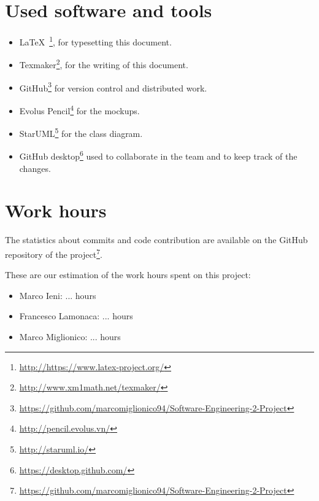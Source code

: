 \section{Used software and tools}
\begin{itemize}
    \item \LaTeX\ \footnote{\url{http://https://www.latex-project.org/}}, for typesetting this document.
    \item Texmaker\footnote{\url{http://www.xm1math.net/texmaker/}}, for the writing of this document.
    \item GitHub\footnote{\url{https://github.com/marcomiglionico94/Software-Engineering-2-Project}} for version control and distributed work.
    \item Evolus Pencil\footnote{\url{http://pencil.evolus.vn/}} for the mockups.
    \item StarUML\footnote{\url{http://staruml.io/}} for the class diagram.
    \item GitHub desktop\footnote{\url{https://desktop.github.com/}} used to collaborate in the team and to keep track of the changes. 
\end{itemize}

\section{Work hours}
The statistics about commits and code contribution are available on the GitHub repository of the project\footnote{\url{https://github.com/marcomiglionico94/Software-Engineering-2-Project}}.

These are our estimation of the work hours spent on this project:
\begin{itemize}
    \item Marco Ieni: ... hours
    \item Francesco Lamonaca: ... hours
    \item Marco Miglionico: ... hours
\end{itemize}

